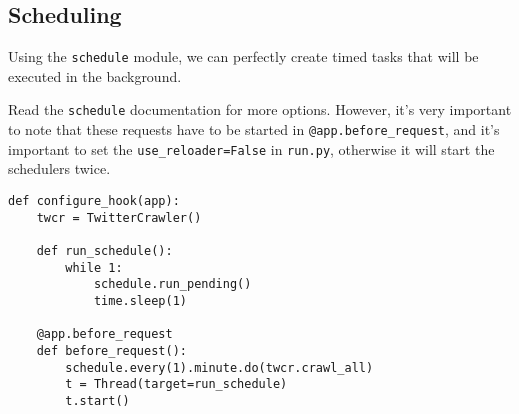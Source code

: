 \documentclass[../main/main.tex]{subfiles}
\begin{document}
\subsection{Scheduling}

Using the \lstinline|schedule| module, we can perfectly create timed tasks that
will be executed in the background. 

Read the \lstinline|schedule| documentation for more options. However, it's very
important to note that these requests have to be started in
\lstinline|@app.before_request|, and it's important to set the
\lstinline|use_reloader=False| in \lstinline|run.py|, otherwise it will start
the schedulers twice. 

\begin{lstlisting}
def configure_hook(app):
    twcr = TwitterCrawler()

    def run_schedule():
        while 1:
            schedule.run_pending()
            time.sleep(1)

    @app.before_request
    def before_request():
        schedule.every(1).minute.do(twcr.crawl_all)
        t = Thread(target=run_schedule)
        t.start()
\end{lstlisting}

% 
\end{document}
